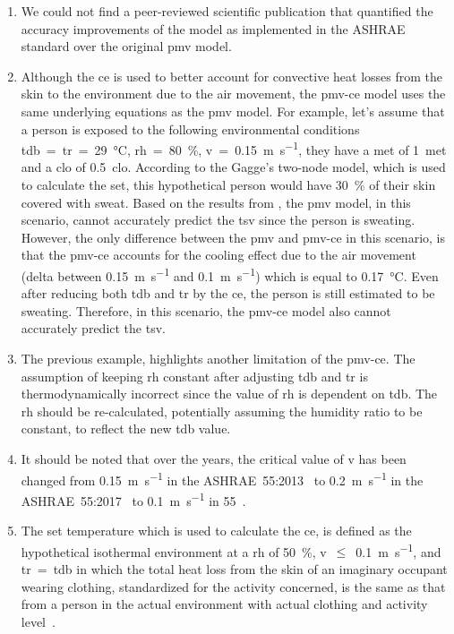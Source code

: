 \begin{enumerate}
    \item We could not find a peer-reviewed scientific publication that quantified the accuracy improvements of the model as implemented in the ASHRAE standard over the original \ac{pmv} model.
    \item Although the \ac{ce} is used to better account for convective heat losses from the skin to the environment due to the air movement, the \ac{pmv-ce} model uses the same underlying equations as the \ac{pmv} model.
    For example, let's assume that a person is exposed to the following environmental conditions \ac{tdb}~=~\ac{tr}~=~\qty{29}{\celsius}, \ac{rh}~=~\qty{80}{\percent}, \ac{v}~=~\qty{0.15}{\m\per\s}, they have a \ac{met} of \qty{1}{met} and a \ac{clo} of \qty{0.5}{clo}.
    According to the Gagge's two-node model, which is used to calculate the \ac{set}, this hypothetical person would have \qty{30}{\percent} of their skin covered with sweat.
    Based on the results from , the \ac{pmv} model, in this scenario, cannot accurately predict the \ac{tsv} since the person is sweating.
    However, the only difference between the \ac{pmv} and \ac{pmv-ce} in this scenario, is that the \ac{pmv-ce} accounts for the cooling effect due to the air movement (delta between \qty{0.15}{\m\per\s} and \qty{0.1}{\m\per\s}) which is equal to \qty{.17}{\celsius}.
    Even after reducing both \ac{tdb} and \ac{tr} by the \ac{ce}, the person is still estimated to be sweating.
    Therefore, in this scenario, the \ac{pmv-ce} model also cannot accurately predict the \ac{tsv}.
    \item The previous example, highlights another limitation of the \ac{pmv-ce}.
    The assumption of keeping \ac{rh} constant after adjusting \ac{tdb} and \ac{tr} is thermodynamically incorrect since the value of \ac{rh} is dependent on \ac{tdb}.
    The \ac{rh} should be re-calculated, potentially assuming the humidity ratio to be constant, to reflect the new \ac{tdb} value.
    \item It should be noted that over the years, the critical value of \ac{v} has been changed from \qty{0.15}{\m\per\s} in the ASHRAE~55:2013~\cite{ASHRAE552013} to \qty{0.2}{\m\per\s} in the ASHRAE~55:2017~\cite{ASHRAE552017, arens_moving_2009} to \qty{0.1}{\m\per\s} in \gls{55}~\cite{ashrae552023}.
    \item The \ac{set} temperature which is used to calculate the \ac{ce}, is defined as the hypothetical isothermal environment at a \ac{rh} of \qty{50}{\percent}, \ac{v}~$\leq$~\qty{0.1}{\m\per\s}, and \ac{tr}~=~\ac{tdb} in which the total heat loss from the skin of an imaginary occupant wearing clothing, standardized for the activity concerned, is the same as that from a person in the actual environment with actual clothing and activity level~\cite{ashrae552023}.

\end{enumerate}
